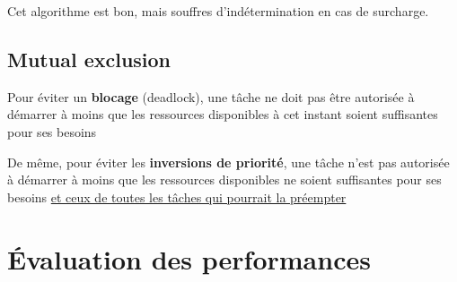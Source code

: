 \documentclass[12pt,a4paper]{article}
\begin{document}
Cet algorithme est bon, mais souffres d'indétermination en cas de surcharge.


\subsection{Mutual exclusion}
\begin{boite}
    Pour éviter un \textbf{blocage} (deadlock), une tâche ne doit pas être autorisée à démarrer à moins que les ressources disponibles à cet instant soient suffisantes pour ses besoins
    
    De même, pour éviter les \textbf{inversions de priorité}, une tâche n'est pas autorisée à démarrer à moins que les ressources disponibles ne soient suffisantes pour ses besoins \uline{et ceux de toutes les tâches qui pourrait la préempter}
\end{boite}



\section{Évaluation des performances}
\end{document}

